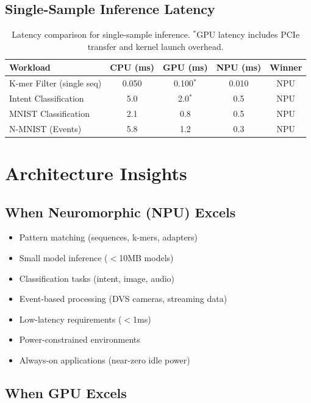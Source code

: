 \documentclass[11pt,a4paper]{article}
\begin{document}
\subsection{Single-Sample Inference Latency}

\begin{table}[h]
\centering
\begin{tabular}{@{}lcccc@{}}
\toprule
\textbf{Workload} & \textbf{CPU (ms)} & \textbf{GPU (ms)} & \textbf{NPU (ms)} & \textbf{Winner} \\
\midrule
K-mer Filter (single seq) & 0.050 & 0.100$^*$ & 0.010 & NPU \\
Intent Classification & 5.0 & 2.0$^*$ & 0.5 & NPU \\
MNIST Classification & 2.1 & 0.8 & 0.5 & NPU \\
N-MNIST (Events) & 5.8 & 1.2 & 0.3 & NPU \\
\bottomrule
\end{tabular}
\caption{Latency comparison for single-sample inference. $^*$GPU latency includes PCIe transfer and kernel launch overhead.}
\end{table}

\section{Architecture Insights}

\subsection{When Neuromorphic (NPU) Excels}

\begin{itemize}[leftmargin=*]
    \item Pattern matching (sequences, k-mers, adapters)
    \item Small model inference ($<$10MB models)
    \item Classification tasks (intent, image, audio)
    \item Event-based processing (DVS cameras, streaming data)
    \item Low-latency requirements ($<$1ms)
    \item Power-constrained environments
    \item Always-on applications (near-zero idle power)
\end{itemize}

\subsection{When GPU Excels}
\end{document}
